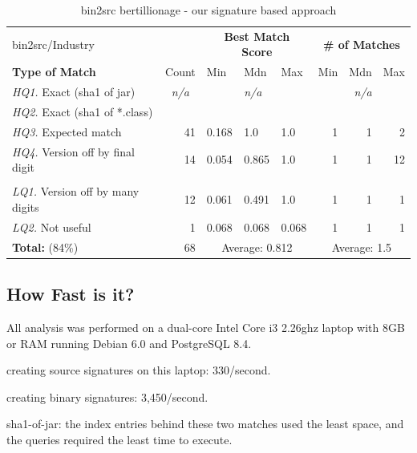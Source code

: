 \begin{table}[h]
  \centering
\begin{tabular}[htbp]{l|r|lll|rrr}
  bin2src/Industry                       &              & \multicolumn{3}{c|}{\textbf{Best Match Score}}  & \multicolumn{3}{c}{\textbf{\# of Matches}} \\
  \textbf{Type of Match}                 & Count        & Min   & Mdn    & Max   & Min  & Mdn  & Max  \\
  \hline
  \emph{HQ1.} Exact (sha1 of jar)        & \multicolumn{1}{c|}{\emph{n/a}} & & \emph{n/a} & & & \emph{n/a} &  \\
  \emph{HQ2.} Exact (sha1 of *.class)    & & & & & & & \\
  \emph{HQ3.} Expected match             &  41          & 0.168 & 1.0    & 1.0   & 1    & 1    &  2   \\
  \emph{HQ4.} Version off by final digit &  14          & 0.054 & 0.865  & 1.0   & 1    & 1    & 12   \\
  & & & & & & & \\
  \emph{LQ1.} Version off by many digits &  12          & 0.061 & 0.491  & 1.0   & 1    & 1    &  1   \\
  \emph{LQ2.} Not useful                 &   1          & 0.068 & 0.068  & 0.068 & 1    & 1    &  1   \\
  \hline
  \textbf{Total:} \hspace{8em}    (84\%) &  68   & \multicolumn{3}{c|}{Average: 0.812}  & \multicolumn{3}{c}{Average: 1.5} \\
\end{tabular}
  \caption{bin2src bertillionage - our signature based approach}
  \label{tab:bankBin2Src}
\end{table}



\subsection{How Fast is it?}

All analysis was performed on 
a dual-core Intel Core i3 2.26ghz laptop with 8GB or RAM running Debian 6.0 and PostgreSQL 8.4.

creating source signatures on this laptop:  330/second.

creating binary signatures:  3,450/second.


sha1-of-jar: the index entries behind these two matches used the least space, and the queries required the least time to execute.

